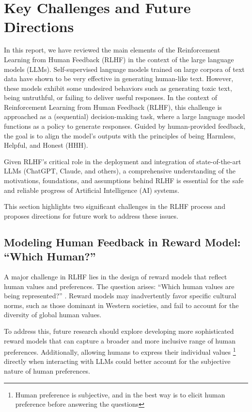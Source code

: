 \section{Key Challenges and Future Directions}
\label{sec:challenges}

In this report, we have reviewed the main elements of the Reinforcement Learning from Human Feedback (RLHF) in the context of the large language models (LLMs). Self-supervised language models trained on large corpora of text data have shown to be very effective in generating human-like text. However, these models exhibit some undesired behaviors such as generating toxic text, being untruthful, or failing to deliver useful responses. 
In the context of Reinforcement Learning from Human Feedback (RLHF), this challenge is approached as a (sequential) decision-making task, where a large language model functions as a policy to generate responses. Guided by human-provided feedback, the goal is to align the model's outputs with the principles of being Harmless, Helpful, and Honest (HHH).


Given RLHF's critical role in the deployment and integration of state-of-the-art LLMs (ChatGPT, Claude, and others), a comprehensive understanding of the motivations, foundations, and assumptions behind RLHF is essential for the safe and reliable progress of Artificial Intelligence (AI) systems.

This section highlights two significant challenges in the RLHF process and proposes directions for future work to address these issues.

\subsection{Modeling Human Feedback in Reward Model: “Which Human?”}

A major challenge in RLHF lies in the design of reward models that reflect human values and preferences. The question arises: “Which human values are being represented?” \cite{atariWhichHumans2023}. Reward models may inadvertently favor specific cultural norms, such as those dominant in Western societies, and fail to account for the diversity of global human values.

To address this, future research should explore developing more sophisticated reward models that can capture a broader and more inclusive range of human preferences. Additionally, allowing humans to express their individual values \footnote{Human preference is subjective, and in the best way is to elicit human preference before answering the questions} directly when interacting with LLMs could better account for the subjective nature of human preferences.


